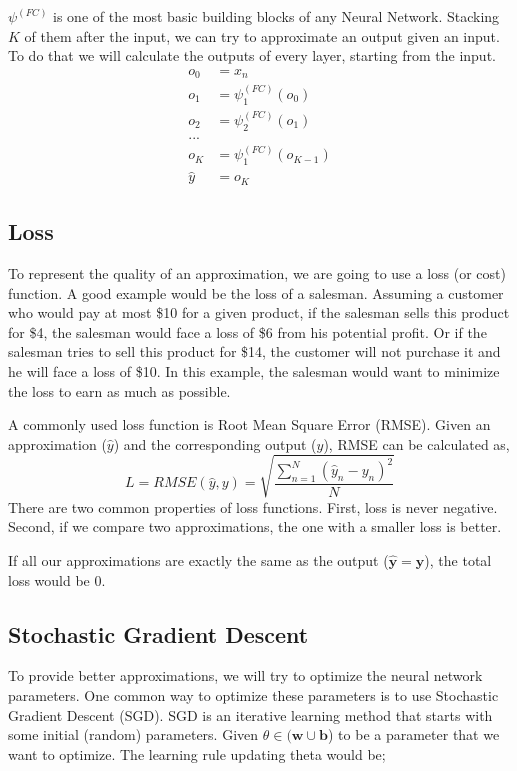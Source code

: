 $\psi^{(FC)}$ is one of the most basic building blocks of any Neural Network. Stacking $K$ of them after the input, we can try to approximate an output given an input. To do that we will calculate the outputs of every layer, starting from the input. 
\begin{equation*}
\begin{split}
o_0 &= x_n\\
o_1 &= \psi_1^{(FC)}(o_0)\\ 
o_2 &= \psi_2^{(FC)}(o_1)\\
...&\\
o_K &= \psi_1^{(FC)}(o_{K-1})\\
\hat y &= o_K
\end{split}
\end{equation*}

\subsection{Loss}
To represent the quality of an approximation, we are going to use a loss (or cost) function. A good example would be the loss of a salesman. Assuming a customer who would pay at most \$10 for a given product, if the salesman sells this product for \$4, the salesman would face a loss of \$6 from his potential profit. Or if the salesman tries to sell this product for \$14, the customer will not purchase it and he will face a loss of \$10. In this example, the salesman would want to minimize the loss to earn as much as possible. 

A commonly used loss function is Root Mean Square Error (RMSE). Given an approximation ($\hat y$) and the corresponding output ($y$), RMSE can be calculated as,
\begin{equation*}
L = RMSE(\hat y, y) = \sqrt{\frac{\sum^N_{n=1} (\hat y_n - y_n)^2 }{N}}
\end{equation*}
There are two common properties of loss functions. First, loss is never negative. Second, if we compare two approximations, the one with a smaller loss is better.

If all our approximations are exactly the same as the output ($  \mathbf{\hat y} =  \mathbf{y} $), the total loss would be 0. 

\subsection{Stochastic Gradient Descent}
To provide better approximations, we will try to optimize the neural network parameters. One common way to optimize these parameters is to use Stochastic Gradient Descent (SGD). SGD is an iterative learning method that starts with some initial (random) parameters. Given $\theta \in (\mathbf{w} \cup \mathbf{b}$) to be a parameter that we want to optimize. The learning rule updating theta would be;

